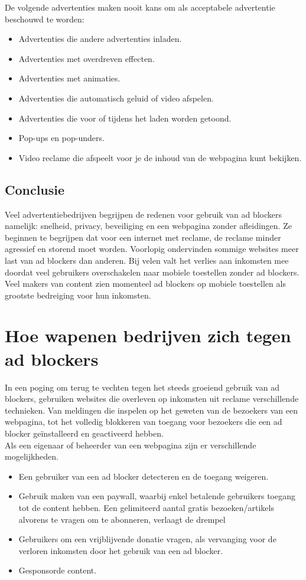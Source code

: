 \documentclass[pdftex,a4paper,12pt,twoside]{report}
\begin{document}
De volgende advertenties maken nooit kans om als acceptabele advertentie beschouwd te worden:

\begin{itemize}
	\item Advertenties die andere advertenties inladen. 
	\item Advertenties met overdreven effecten.
	\item Advertenties met animaties.
	\item Advertenties die automatisch geluid of video afspelen.
	\item Advertenties die voor of tijdens het laden worden getoond.
	\item Pop-ups en pop-unders.
	\item Video reclame die afspeelt voor je de inhoud van de webpagina kunt bekijken.
\end{itemize}

\section{Conclusie}
\label{sec Conclusie}
Veel advertentiebedrijven begrijpen de redenen voor gebruik van ad blockers namelijk: snelheid, privacy, beveiliging en een webpagina zonder afleidingen. Ze beginnen te begrijpen dat voor een internet met reclame, de reclame minder agressief en storend moet worden. Voorlopig ondervinden sommige websites meer last van ad blockers dan anderen. Bij velen valt het verlies aan inkomsten mee doordat veel gebruikers overschakelen naar mobiele toestellen zonder ad blockers. Veel makers van content zien momenteel ad blockers op mobiele toestellen als grootste bedreiging voor hun inkomsten.


\chapter{Hoe wapenen bedrijven zich tegen ad blockers}
\label{ch:Hoe wapenen bedrijven zich tegen ad blockers}
In een poging om terug te vechten tegen het steeds groeiend gebruik van ad blockers, gebruiken websites die overleven op inkomsten uit reclame verschillende technieken. Van meldingen die inspelen op het geweten van de bezoekers van een webpagina, tot het volledig blokkeren van toegang voor bezoekers die een ad blocker geïnstalleerd en geactiveerd hebben.
\\
Als een eigenaar of beheerder van een webpagina zijn er verschillende mogelijkheden. 

\begin{itemize}
	\item Een gebruiker van een ad blocker detecteren en de toegang weigeren.
	\item Gebruik maken van een paywall, waarbij enkel betalende gebruikers toegang tot de content hebben. Een gelimiteerd aantal gratis bezoeken/artikels alvorens te vragen om te abonneren, verlaagt de drempel 
	\item Gebruikers om een vrijblijvende donatie vragen, als vervanging voor de verloren inkomsten door het gebruik van een ad blocker.
	\item Gesponsorde content.	
\end{itemize}
\end{document}
